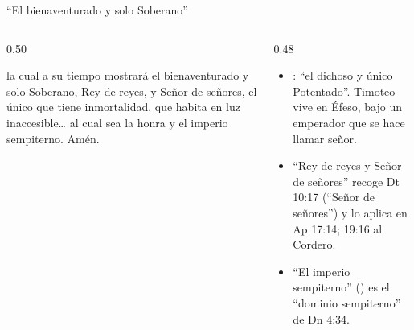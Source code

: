 \begin{frame}{``El bienaventurado y solo Soberano''}
\begin{columns}[t,onlytextwidth]
\begin{column}{0.50\textwidth}
\begin{cita}la cual a su tiempo mostrará el bienaventurado y solo Soberano, Rey de reyes, y Señor de señores, el único que tiene inmortalidad, que habita en luz inaccesible\ldots{} al cual sea la honra y el imperio sempiterno. Amén.\end{cita}
\end{column}
\begin{column}{0.48\textwidth}\small
\begin{itemize}
\item {}: ``el dichoso y único Potentado''. Timoteo vive en Éfeso, bajo un emperador que se hace llamar señor.
\item ``Rey de reyes y Señor de señores'' recoge Dt 10:17 (``Señor de señores'') y lo aplica en Ap 17:14; 19:16 al Cordero.
\item ``El imperio sempiterno'' () es el ``dominio sempiterno'' de Dn 4:34.
\end{itemize}
\end{column}
\end{columns}\par\smallskip
{}
\end{frame}

